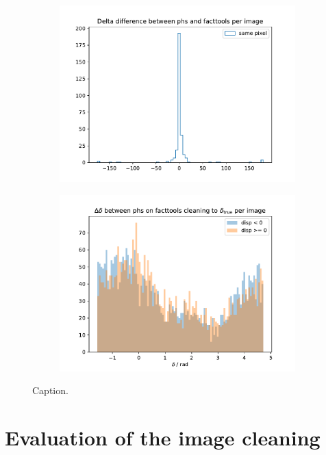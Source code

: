 \begin{figure}
\begin{subfigure}{0.5\textwidth}
    \includegraphics[width=1.1\textwidth]{Plots/delta_hist_same_cleaning_pe_20131104_162.pdf}
  \end{subfigure}
  \begin{subfigure}{0.5\textwidth}
    \includegraphics[width=1.1\textwidth]{Plots/delta_true_diff_hist_thresholds_rad_20131104_162.pdf}
  \end{subfigure}
  \caption{Caption.}
  \label{fig:delta}
\end{figure}

\section{Evaluation of the image cleaning}
%
